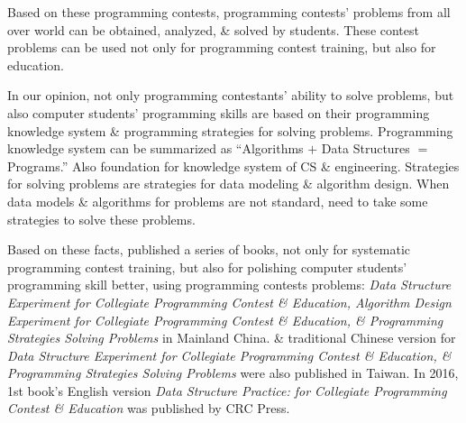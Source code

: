 \documentclass{article}
\begin{document}
\begin{itemize}
	Based on these programming contests, programming contests' problems from all over world can be obtained, analyzed, \& solved by students. These contest problems can be used not only for programming contest training, but also for education.
	
	In our opinion, not only programming contestants' ability to solve problems, but also computer students' programming skills are based on their programming knowledge system \& programming strategies for solving problems. Programming knowledge system can be summarized as ``Algorithms $+$ Data Structures $=$ Programs.'' Also foundation for knowledge system of CS \& engineering. Strategies for solving problems are strategies for data modeling \& algorithm design. When data models \& algorithms for problems are not standard, need to take some strategies to solve these problems.
	
	Based on these facts, published a series of books, not only for systematic programming contest training, but also for polishing computer students' programming skill better, using programming contests problems: {\it Data Structure Experiment for Collegiate Programming Contest \& Education, Algorithm Design Experiment for Collegiate Programming Contest \& Education, \& Programming Strategies Solving Problems} in Mainland China. \& traditional Chinese version for {\it Data Structure Experiment for Collegiate Programming Contest \& Education, \& Programming Strategies Solving Problems} were also published in Taiwan. In 2016, 1st book's English version {\it Data Structure Practice: for Collegiate Programming Contest \& Education} was published by CRC Press.
	

\end{itemize}
\end{document}
